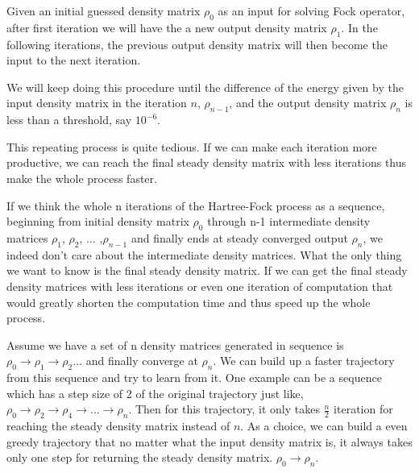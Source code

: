 \documentclass[twoside]{article}
\begin{document}
Given an initial guessed density matrix $\rho_0$ as an input for solving Fock operator, after first iteration we will have the a new output density matrix $\rho_1$. In the following iterations, the previous output density matrix will then become the input to the next iteration. 

We will keep doing this procedure until the difference of the energy given by the input density matrix in the iteration $n$, $\rho_{n-1}$,  and the output density matrix $\rho_n$ is less than a threshold, say $10^{-6}$. 

This repeating process is quite tedious. If we can make each iteration more productive, we can reach the final steady density matrix with less iterations thus make the whole process faster.

If we think the whole n iterations of the Hartree-Fock process as a sequence, beginning from initial density matrix $\rho_0$ through n-1 intermediate density matrices $\rho_1$,  $\rho_2$,  $\ldots$ ,$\rho_{n-1}$ and finally ends at steady converged output $\rho_{n}$, we indeed don't care about the intermediate density matrices. What the only thing we want to know is the final steady density matrix. If we can get the final steady density matrices with less iterations or even one iteration of computation that would greatly shorten the computation time and thus speed up the whole process. 



Assume we have a set of n density matrices generated in sequence is  $\rho_0 \rightarrow  \rho_1 \rightarrow  \rho_2  \ldots  $ and finally converge at $\rho_{n}$. 
We can build up a faster trajectory from this sequence and try to learn from it.
One example can be a sequence which has a step size of 2 of the original trajectory just like, $\rho_0 \rightarrow \rho_2 \rightarrow  \rho_4 \rightarrow  \ldots \rightarrow  \rho_{n}$. Then for this trajectory, it only takes $\frac{n}{2}$ iteration for reaching the steady density matrix instead of $n$.
As a choice, we can build a even greedy trajectory that no matter what the input density matrix is, it always takes only one step for returning the steady density matrix. $\rho_0 \rightarrow \rho_{n}$.
\end{document}
